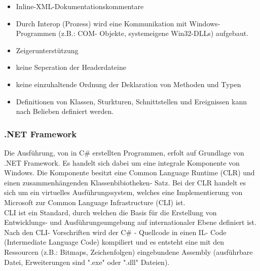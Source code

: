 \documentclass[12pt,a4paper]{report}
\begin{document}
\begin{onehalfspace}
\begin{itemize}
\item Inline-XML-Dokumentationskommentare
\item Durch Interop (Prozess) wird eine Kommunikation mit Windows- Programmen (z.B.: COM- Objekte, systemeigene Win32-DLLs) aufgebaut.
\item Zeigerunterstützung
\item keine Seperation der Headerdateine
\item keine einzuhaltende Ordnung der Deklaration von Methoden und Typen
\item Definitionen von Klassen, Sturkturen, Schnittstellen und Ereignissen kann nach Belieben definiert werden.
\end{itemize}

\subsubsection{.NET Framework}
Die Ausführung, von in C\# erstellten Programmen, erfolt auf Grundlage von .NET Framework. Es handelt sich dabei um eine integrale Komponente von Windows. Die Komponente besitzt eine Common Language Runtime (CLR) und einen zusammenhängenden Klassenbibiotheken- Satz. Bei der CLR handelt es sich um ein virtuelles Ausführungssystem, welches eine Implementierung von Microsoft zur Common Language Infrastructure (CLI) ist.\\

CLI ist ein Standard, durch welchen die Basis für die Erstellung von Entwicklungs- und Ausführungsumgebung auf internationaler Ebene definiert ist. Nach den CLI- Vorschriften wird der C\# - Quellcode in einen IL- Code (Intermediate Language Code) kompiliert und es entsteht eine mit den Ressourcen (z.B.: Bitmaps, Zeichenfolgen) eingebundene Assembly (ausführbare Datei, Erweiterungen sind "{}.exe"{} oder "{}.dll"{} Dateien).\\


\end{onehalfspace}
\end{document}
